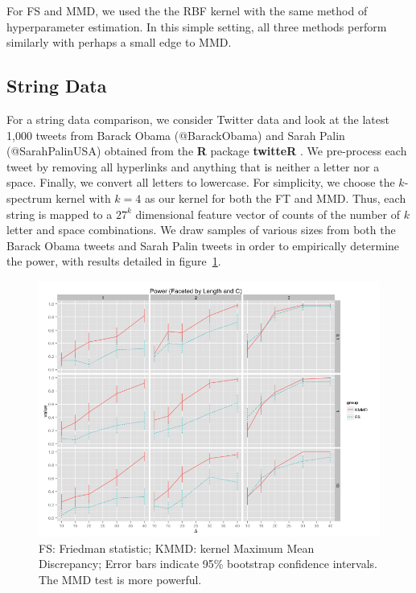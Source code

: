 For FS and MMD, we used the the RBF kernel with the same method of
hyperparameter estimation.  In this simple setting, all three methods
perform similarly with perhaps a small edge to MMD.

\subsection{String Data}
\label{twitter_data}
For a string data comparison, we consider Twitter data and look at the
latest 1,000 tweets from Barack Obama (@BarackObama) and Sarah Palin
(@SarahPalinUSA) obtained from the {\bf R} package {\bf twitteR}
\cite{twitteR}.  We pre-process each tweet by removing all
hyperlinks and anything that is neither a letter nor a space.
Finally, we convert all letters to lowercase.  For simplicity, we
choose the $k$-spectrum kernel \cite{leslie2002spectrum} with $k=4$ 
as our kernel for both the FT and MMD.  Thus, each string is mapped to
a $27^k$ dimensional feature vector of counts of the number of $k$
letter and space combinations.  We draw samples of various sizes from
both the Barack Obama tweets and Sarah Palin tweets in order to
empirically determine the power, with results detailed in
figure~\ref{fig:power_string}.

\begin{figure}
  \centering
  \includegraphics[width=\linewidth]{power_string.png}
  \caption{FS: Friedman statistic; KMMD: kernel Maximum Mean
    Discrepancy; Error bars indicate 95\% bootstrap confidence
    intervals.  The MMD test is more powerful.}
  \label{fig:power_string}
\end{figure}

